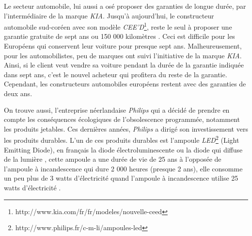 \bigbreak
Le secteur automobile, lui aussi a osé proposer des garanties de longue durée, par l'intermédiaire de la marque \textit{KIA}. Jusqu'à aujourd'hui, le constructeur automobile sud-coréen avec son modèle \textit{CEE'D}\footnote{http://www.kia.com/fr/fr/modeles/nouvelle-ceed}, reste le seul à proposer une garantie gratuite de sept ans ou 150 000 kilomètres \cite{kia}. Ceci est difficile pour les Européens qui conservent leur voiture pour presque sept ans. Malheureusement, pour les automobilistes, peu de marques ont suivi l’initiative de la marque \textit{KIA}. Ainsi, si le client veut vendre sa voiture pendant la durée de la garantie indiquée dans sept ans, c'est le nouvel acheteur qui profitera du reste de la garantie. Cependant, les constructeurs automobiles européens restent avec des garanties de deux ans.

\bigbreak
On trouve aussi, l'entreprise néerlandaise \textit{Philips} qui a décidé de prendre en compte les conséquences écologiques de l'obsolescence programmée, notamment les produits jetables. Ces dernières années, \textit{Philips} a dirigé son investissement vers  les produits durables. L'un de ces produits durables est l'ampoule \textit{LED}\footnote{http://www.philips.fr/c-m-li/ampoules-led} (Light Emitting Diode), en français la diode électroluminescente ou la diode qui  diffuse de la lumière , cette ampoule a une durée de vie de 25 ans à l'opposée de l'ampoule à incandescence qui dure 2 000 heures (presque 2 ans), elle consomme un peu plus de 3 watts d’électricité quand l'ampoule à incandescence utilise 25 watts d’électricité \cite{ampoule_inc}. 


